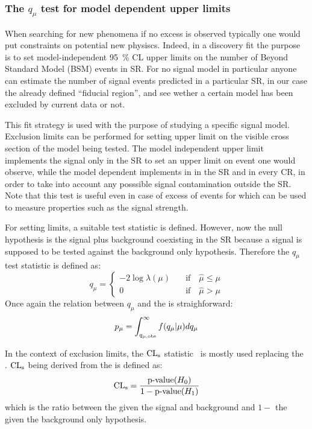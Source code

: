 \subsubsection{The $q_\mu$ test for model dependent upper limits}
When searching for new phenomena if no excess is observed typically one would put constraints on potential new physiscs. Indeed, in a discovery fit the purpose is to set model-independent \SI{95}{\percent} CL upper limits on the number of Beyond Standard Model (BSM) events in SR. For no signal model in particular anyone can estimate the number of signal events predicted in a particular SR, in our case the already defined ``fiducial region'', and see wether a certain model has been excluded by current data or not.

This fit strategy is used with the purpose of studying a specific signal model. Exclusion limits can be performed for setting upper limit on the visible cross section of the model being tested. The model independent upper limit implements the signal only in the SR to set an upper limit on event one would observe, while the model dependent implements in in the SR and in every CR, in order to take into account any posssible signal contamination outside the SR. Note that this test is useful even in case of excess of events for which can be used to measure properties such as the signal strength.

For setting limits, a suitable test statistic is defined. However, now the null hypothesis is the signal plus background coexisting in the SR because a signal is supposed to be tested against the background only hypothesis. Therefore the $q_\mu$ test statistic is defined as:
\begin{equation}
q_\mu=
\left\{
\begin{aligned}
-2\log{\lambda(\mu)}\quad &\text{if}\quad \hat{\mu}\le\mu\\
 0 \qquad&\text{if}\quad \hat{\mu}>\mu
\end{aligned}
\right.
\end{equation} 
Once again the relation between $q_\mu$ and the \p is straighforward:
\begin{equation}
 p_{\mu}=\int_{q_{\mu,\textup{obs}}}^\infty f(q_\mu \vert \mu) dq_\mu
 \label{eqn:pdaqmu}
\end{equation}

In the context of exclusion limits, the $\text{CL}_\textup{s}$ statistic~\cite{Read:451614} is mostly used replacing the \p. $\text{CL}_\textup{s}$ being derived from the \p is defined as:
\begin{equation}
	\text{CL}_\textup{s}=\frac{\text{p-value}(H_0)}{1-\text{p-value}(H_1)}
\end{equation}
which is the ratio between the \p given the signal and background and $1-$ the \p given the background only hypothesis.

